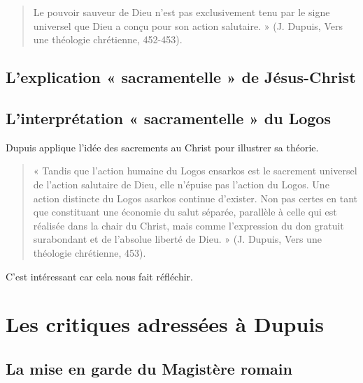 \begin{quote}
    Le pouvoir sauveur de Dieu n’est pas exclusivement tenu par le signe universel que Dieu a conçu
pour son action salutaire. » (J. Dupuis, Vers une théologie chrétienne, 452-453).
 
\end{quote}


\subsection{L’explication « sacramentelle » de Jésus-Christ}
 

\subsection{L’interprétation « sacramentelle » du Logos}
 Dupuis applique l'idée des sacrements au Christ pour illustrer sa théorie.
\begin{quote}
    « Tandis que l’action humaine du Logos ensarkos est le sacrement universel de l’action salutaire de
Dieu, elle n’épuise pas l’action du Logos. Une action distincte du Logos asarkos continue d’exister.
Non pas certes en tant que constituant une économie du salut séparée, parallèle à celle qui est réalisée
dans la chair du Christ, mais comme l’expression du don gratuit surabondant et de l’absolue liberté de
Dieu. » (J. Dupuis, Vers une théologie chrétienne, 453).
\end{quote}


C'est intéressant car cela nous fait réfléchir.

\begin{Synthesis}
    
\end{Synthesis}

\section{Les critiques adressées à Dupuis}



\subsection{La mise en garde du Magistère romain}

